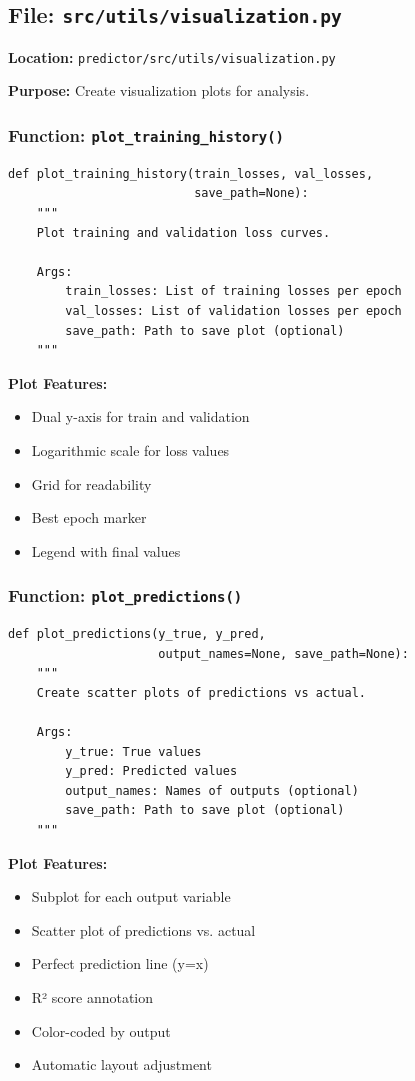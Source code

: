 \documentclass[11pt,a4paper]{article}
\begin{document}
\subsection{File: \texttt{src/utils/visualization.py}}

\textbf{Location:} \texttt{predictor/src/utils/visualization.py}

\textbf{Purpose:} Create visualization plots for analysis.

\subsubsection{Function: \texttt{plot\_training\_history()}}

\begin{lstlisting}
def plot_training_history(train_losses, val_losses,
                          save_path=None):
    """
    Plot training and validation loss curves.

    Args:
        train_losses: List of training losses per epoch
        val_losses: List of validation losses per epoch
        save_path: Path to save plot (optional)
    """
\end{lstlisting}

\textbf{Plot Features:}
\begin{itemize}
    \item Dual y-axis for train and validation
    \item Logarithmic scale for loss values
    \item Grid for readability
    \item Best epoch marker
    \item Legend with final values
\end{itemize}

\subsubsection{Function: \texttt{plot\_predictions()}}

\begin{lstlisting}
def plot_predictions(y_true, y_pred,
                     output_names=None, save_path=None):
    """
    Create scatter plots of predictions vs actual.

    Args:
        y_true: True values
        y_pred: Predicted values
        output_names: Names of outputs (optional)
        save_path: Path to save plot (optional)
    """
\end{lstlisting}

\textbf{Plot Features:}
\begin{itemize}
    \item Subplot for each output variable
    \item Scatter plot of predictions vs. actual
    \item Perfect prediction line (y=x)
    \item R² score annotation
    \item Color-coded by output
    \item Automatic layout adjustment
\end{itemize}
\end{document}

